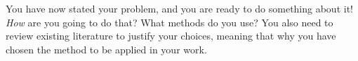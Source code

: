 You have now stated your problem, and you are ready to do something
about it!  \emph{How} are you going to do that? What methods do you
use?  You also need to review existing literature to justify your
choices, meaning that why you have chosen the method to be applied in
your work.


